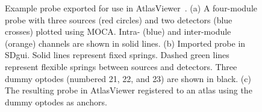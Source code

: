 \begin{figure}
\begin{center}
\end{center}
\caption{Example probe exported for use in AtlasViewer~\cite{Aasted2015}. (a) A four-module probe with three sources (red circles) and two detectors (blue crosses) plotted using MOCA. Intra- (blue) and inter-module (orange) channels are shown in solid lines. (b) Imported probe in SDgui. Solid lines represent fixed springs. Dashed green lines represent flexible springs between sources and detectors. Three dummy optodes (numbered 21, 22, and 23) are shown in black. (c) The resulting probe in AtlasViewer registered to an atlas using the dummy optodes as anchors.}
\label{fig:SDoutput}

\end{figure} 



